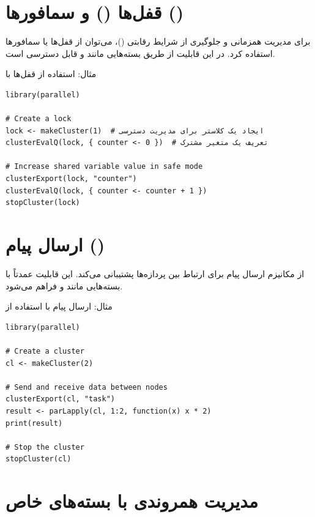\documentclass[11pt, a4paper, oneside]{book}
\begin{document}
		\section{قفل‌ها () و سمافورها ()}
		
			برای مدیریت همزمانی و جلوگیری از شرایط رقابتی ()، می‌توان از قفل‌ها یا سمافورها استفاده کرد. در  این قابلیت از طریق بسته‌هایی مانند  و  قابل دسترسی است.
			
			مثال: استفاده از قفل‌ها با 
			
			\begin{latin}
				\begin{lstlisting}[caption={\lr{Locks in parallel}}] 
library(parallel)

# Create a lock
lock <- makeCluster(1)  # ایجاد یک کلاستر برای مدیریت دسترسی
clusterEvalQ(lock, { counter <- 0 })  # تعریف یک متغیر مشترک

# Increase shared variable value in safe mode
clusterExport(lock, "counter")
clusterEvalQ(lock, { counter <- counter + 1 })
stopCluster(lock)

				\end{lstlisting}
			\end{latin}
		
		\section{ارسال پیام ()}
		
			از مکانیزم ارسال پیام برای ارتباط بین پردازه‌ها پشتیبانی می‌کند. این قابلیت عمدتاً با بسته‌هایی مانند  و  فراهم می‌شود.
			
			مثال: ارسال پیام با استفاده از 
			
			\begin{latin}
				\begin{lstlisting}[caption={\lr{Message Passing in makeCluster}}] 
library(parallel)

# Create a cluster
cl <- makeCluster(2)

# Send and receive data between nodes
clusterExport(cl, "task")
result <- parLapply(cl, 1:2, function(x) x * 2)
print(result)

# Stop the cluster
stopCluster(cl)

				\end{lstlisting}
			\end{latin}
		
		\section{مدیریت همروندی با بسته‌های خاص}
		
\end{document}

